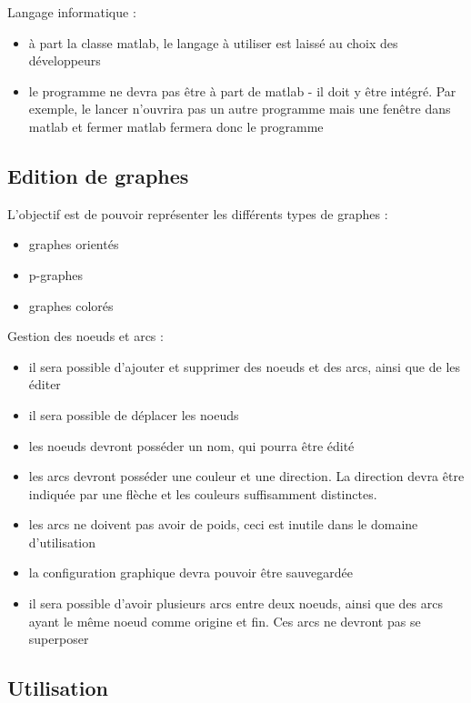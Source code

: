 \documentclass[pidr]{tnreport}
\begin{document}
Langage informatique :

\begin{itemize}
\item à part la classe matlab, le langage à utiliser est laissé au choix des développeurs
\item le programme ne devra pas être à part de matlab - il doit y être intégré. Par exemple, le lancer n’ouvrira pas un autre programme mais une fenêtre dans matlab et fermer matlab fermera donc le programme
\end{itemize}


\subsection{Edition de graphes}

L’objectif est de pouvoir représenter les différents types de graphes : 

\begin{itemize}
\item graphes orientés
\item p-graphes
\item graphes colorés
\end{itemize}

Gestion des noeuds et arcs : 

\begin{itemize}
\item il sera possible d’ajouter et supprimer des noeuds et des arcs, ainsi que de les éditer
\item il sera possible de déplacer les noeuds
\item les noeuds devront posséder un nom, qui pourra être édité
\item les arcs devront posséder une couleur et une direction. La direction devra être indiquée par une flèche et les couleurs suffisamment distinctes.
\item les arcs ne doivent pas avoir de poids, ceci est inutile dans le domaine d’utilisation
\item la configuration graphique devra pouvoir être sauvegardée
\item il sera possible d’avoir plusieurs arcs entre deux noeuds, ainsi que des arcs ayant le même noeud comme origine et fin. Ces arcs ne devront pas se superposer
\end{itemize}

\subsection{Utilisation}
\end{document}
